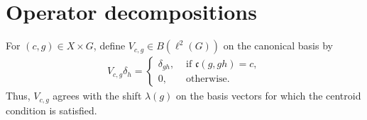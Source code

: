 \documentclass[12pt,reqno]{amsart}
\numberwithin{equation}{section}
\begin{document}
\section{Operator decompositions}\label{section: proofs}
For $(c,g)\in X\times G$, define $V_{c,g}\in B(\ell^2(G))$ on the canonical basis by
\begin{align*}
    V_{c,g}\delta_h=\begin{cases}
        \delta_{gh},&\text{ if }\mathfrak{c}(g,gh)=c,\\
        0,&\text{ otherwise}.
    \end{cases}
\end{align*}
Thus, $V_{c,g}$ agrees with the shift $\lambda(g)$ on the basis vectors for which the centroid condition is satisfied. 
\end{document}
